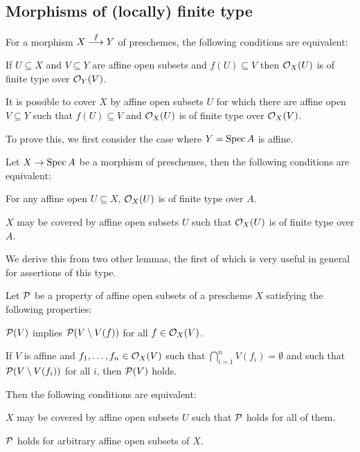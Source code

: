 \documentclass[a4paper,parskip=half,numbers=enddot, DIV=12]{scrreprt}
\begin{document}
\subsection{Morphisms of (locally) finite type}
\begin{prop}
    For a morphism $X\morphism[f] Y$ of preschemes, the following conditions are equivalent:
    \begin{alphanumerate}
    \item 
        If $U\subseteq X$ and $V\subseteq Y$ are affine open subsets and $f(U)\subseteq V$ then $\mathcal{O}_X(U)$ is of finite type over $\mathcal{O}_Y(V)$.
    \item 
        It is possible to cover $X$ by affine open subsets $U$ for which there are affine open $V\subseteq Y$ such that $f(U) \subseteq V$ and $\mathcal{O}_X(U)$ is of finite type over $\mathcal{O}_X(V)$.
    \end{alphanumerate}
\end{prop}
To prove this, we first consider the case where $Y=\operatorname{Spec} A$ is affine.
\begin{lem}
    Let $X\morphism \Spec A$ be a morphism of preschemes, then the following conditions are equivalent:
    \begin{alphanumerate}
    \item   
        For any affine open $U\subseteq X$, $\mathcal{O}_X(U)$ is of finite type over $A$.
    \item 
        $X$ may be covered by affine open subsets $U$ such that $\mathcal{O}_X(U)$ is of finite type over $A$.
    \end{alphanumerate}
\end{lem}
We derive this from two other lemmas, the first of which is very useful in general for assertions of this type.
\begin{lem}
    Let $\mathcal{P}$ be a property of affine open subsets of a prescheme $X$ satisfying the following properties:
    \begin{alphanumerate}
    \item[\itememph{\alpha}] 
        $\mathcal{P}(V)$ implies $\mathcal{P}(V\setminus V(f))$ for all $f\in \mathcal{O}_X(V)$.
    \item[\itememph{\beta}] 
        If $V$ is affine and $f_1,\ldots,f_n \in \mathcal{O}_X(V)$ such that $\bigcap_{i=1}^n V(f_i)=\emptyset$ and such that $\mathcal{P}(V\setminus V(f_i))$ for all $i$, then $\mathcal{P}(V)$ holds.
    \end{alphanumerate}
    Then the following conditions are equivalent:
    \begin{alphanumerate}
      \item
        $X$ may be covered by affine open subsets $U$ such that $\mathcal{P}$ holds for all of them.
    \item
        $\mathcal{P}$ holds for arbitrary affine open subsets of $X$.
    \end{alphanumerate}
\end{lem}
\end{document}
